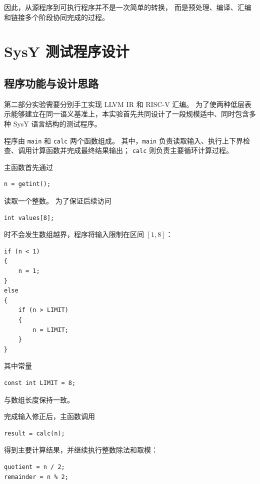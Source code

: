 \documentclass[12pt,a4paper]{ctexart}
\begin{document}
因此，从源程序到可执行程序并不是一次简单的转换，
而是预处理、编译、汇编和链接多个阶段协同完成的过程。
\section{SysY 测试程序设计}

\subsection{程序功能与设计思路}

第二部分实验需要分别手工实现 LLVM IR 和 RISC-V 汇编。
为了使两种低层表示能够建立在同一语义基准上，本实验首先共同设计了一段规模适中、同时包含多种 SysY 语言结构的测试程序。

程序由 \texttt{main} 和 \texttt{calc} 两个函数组成。
其中，\texttt{main} 负责读取输入、执行上下界检查、调用计算函数并完成最终结果输出；
\texttt{calc} 则负责主要循环计算过程。

主函数首先通过

\begin{lstlisting}
n = getint();
\end{lstlisting}

读取一个整数。
为了保证后续访问

\begin{lstlisting}
int values[8];
\end{lstlisting}

时不会发生数组越界，程序将输入限制在区间 $[1,8]$：

\begin{lstlisting}
if (n < 1)
{
    n = 1;
}
else
{
    if (n > LIMIT)
    {
        n = LIMIT;
    }
}
\end{lstlisting}

其中常量

\begin{lstlisting}
const int LIMIT = 8;
\end{lstlisting}

与数组长度保持一致。

完成输入修正后，主函数调用

\begin{lstlisting}
result = calc(n);
\end{lstlisting}

得到主要计算结果，并继续执行整数除法和取模：

\begin{lstlisting}
quotient = n / 2;
remainder = n % 2;
\end{lstlisting}
\end{document}
